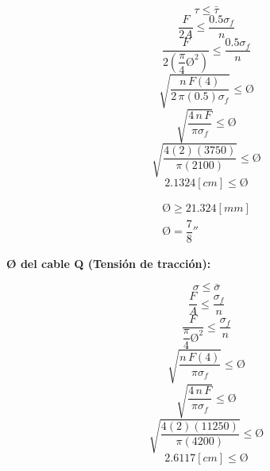 \documentclass[letter,10pt,twoside]{article}
\begin{document}
\begin{equation*}
    \tau \le \bar{\tau}
\end{equation*}
\begin{equation*}
    \frac{F}{2A} \le \frac{0.5 \sigma_f}{n}
\end{equation*}
\begin{equation*}
    \frac{F}{2(\dfrac{\pi}{4} \text{\O}^2)} \le \frac{0.5 \sigma_f}{n}
\end{equation*}
\begin{equation*}
    \sqrt{\frac{n\,F(4)}{2\,\pi(0.5)\sigma_f}} \le \text{\O}
\end{equation*}
\begin{equation*}
    \sqrt{\frac{4\,n\,F}{\pi\sigma_f}} \le \text{\O}
\end{equation*}
\begin{equation*}
    \sqrt{\frac{4(2)(3750)}{\pi(2100)}} \le \text{\O}
\end{equation*}
\begin{equation*}
    2.1324[cm] \le \text{\O}
\end{equation*}

\begin{equation*}
\boxed{
    \begin{array}{l}
        \text{\O} \ge 21.324[mm] \\
        \text{\O} = \dfrac{7}{8}''
    \end{array}
}
\end{equation*}

\textbf{{\O} del cable Q (Tensión de tracción):}

\begin{equation*}
    \sigma \le \bar{\sigma}
\end{equation*}
\begin{equation*}
    \frac{F}{A} \le \frac{\sigma_f}{n}
\end{equation*}
\begin{equation*}
    \frac{F}{\dfrac{\pi}{4} \text{\O}^2} \le \frac{\sigma_f}{n}
\end{equation*}
\begin{equation*}
    \sqrt{\frac{n\,F(4)}{\pi\sigma_f}} \le \text{\O}
\end{equation*}
\begin{equation*}
    \sqrt{\frac{4\,n\,F}{\pi\sigma_f}} \le \text{\O}
\end{equation*}
\begin{equation*}
    \sqrt{\frac{4(2)(11250)}{\pi(4200)}} \le \text{\O}
\end{equation*}
\begin{equation*}
    2.6117[cm] \le \text{\O}
\end{equation*}
\end{document}
